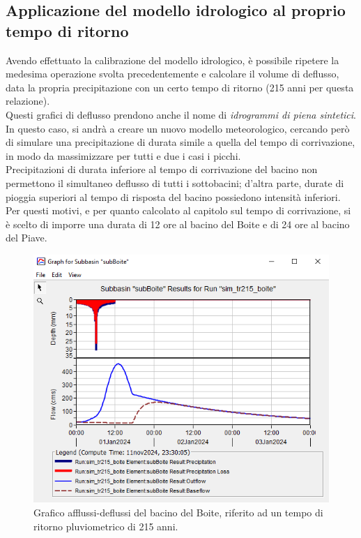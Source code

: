 \subsection{Applicazione del modello idrologico al proprio tempo di ritorno}
Avendo effettuato la calibrazione del modello idrologico, è possibile ripetere la medesima operazione svolta precedentemente e calcolare il volume di deflusso, data la propria precipitazione con un certo tempo di ritorno (215 anni per questa relazione).\\
Questi grafici di deflusso prendono anche il nome di \textit{idrogrammi di piena sintetici}.\\
In questo caso, si andrà a creare un nuovo modello meteorologico, cercando però di simulare una precipitazione di durata simile a quella del tempo di corrivazione, in modo da massimizzare per tutti e due i casi i picchi.\\
Precipitazioni di durata inferiore al tempo di corrivazione del bacino non permettono il simultaneo deflusso di tutti i sottobacini; d'altra parte, durate di pioggia superiori al tempo di risposta del bacino possiedono intensità inferiori.\\
Per questi motivi, e per quanto calcolato al capitolo sul tempo di corrivazione, si è scelto di imporre una durata di 12 ore al bacino del Boite e di 24 ore al bacino del Piave.

\begin{figure}[H]\centering
    \includegraphics[scale=0.9]{immagini/boite_215.PNG}
    \caption{Grafico afflussi-deflussi del bacino del Boite, riferito ad un tempo di ritorno pluviometrico di 215 anni.}
        \label{boite_215}    
\end{figure}

